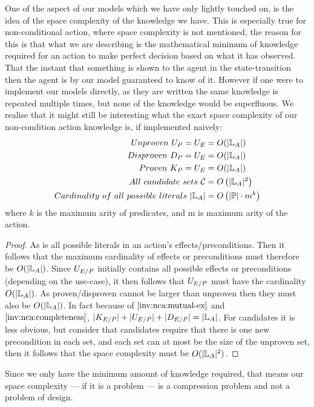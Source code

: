 \documentclass[../Master.tex]{subfiles}
\begin{document}
One of the aspect of our models which we have only lightly touched on, is the idea of the space complexity of the knowledge we have.
This is especially true for non-conditional action, where space complexity is not mentioned, 
the reason for this is that what we are describing is the mathematical minimum of knowledge required for an action to make perfect decision based on what it has observed.
That the instant that something is shown to the agent in the state-transition then the agent is by our model guaranteed to know of it.
However if one were to implement our models directly, as they are written the same knowledge is repeated multiple times, but none of the knowledge would be superfluous.
We realise that it might still be interesting what the exact space complexity of our non-condition action knowledge is, if implemented naively:
 \begin{align*}
 	Unproven ~U_P = U_E & = O(|\mathbb{L}_A|) \\
 	Disproven~D_P = U_E & = O(|\mathbb{L}_A|) \\
 	Proven~K_P = U_E &= O(|\mathbb{L}_A|) \\
 	All ~ candidate~sets~ \mathcal{C} & = O\left(|\mathbb{L}_A|^2\right) \\
    Cardinality~ of ~all~ possible~ literals  ~ |\mathbb{L}_A| & = O \left( |\mathbb{P}| \cdot m ^k \right) \\
 \end{align*} 
 where $k$ is the maximum arity of predicates, and m is maximum arity of the action.
 \begin{proof} 
 	As \litsa is all possible literals in an action's effects/preconditions. Then
 	it follows that the maximum cardinality of effects or preconditions must therefore be $O(|\mathbb{L}_A|)$.
Since $U_{E/P}$ initially contains all possible effects or preconditions (depending on the use-case), 
	it then follows that $U_{E/P}$ must have the cardinality $O(|\mathbb{L}_A|)$. 
	As proven/disproven cannot be larger than unproven then they must also be $O(|\mathbb{L}_A|)$.
	In fact because of $\Cref{inv:nca:mutual-ex}$ and $\Cref{inv:nca:completeness}$, $|K_{E/P}|+|U_{E/P}|+|D_{E/P}| = |\mathbb{L}_A|$.
	For candidates it is less obvious, but consider that candidates require that there is one new precondition in
	each set, and each set can at most be the size of the unproven set, then it follows that the space complexity must be $O(|\mathbb{L}_A|^2)$.
 \end{proof}
Since we only have the minimum amount of knowledge required, that means our space complexity --- if it is a problem --- is a compression problem and not a problem of design. 
\end{document}
